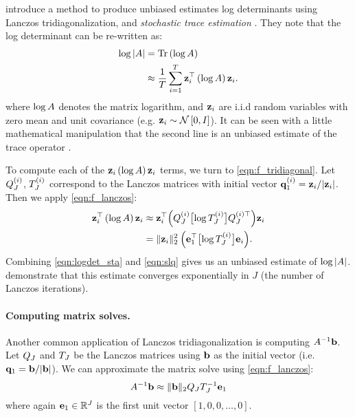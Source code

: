 \citet{ubaru2017fast} introduce a method to produce unbiased estimates log determinants using Lanczos tridiagonalization, and \emph{stochastic trace estimation} \cite{hutchinson1990stochastic,avron2011randomized,fitzsimons2016improved}.
They note that the log determinant can be re-written as:
%
\begin{align}
  \log \vert \bA \vert &= \tr{ \log \bA }
  \nonumber \\
  &\approx \frac{1}{T} \sum_{i=1}^T \bz_i^\top \left( \log \bA \right) \bz_i.
  \label{eqn:logdet_sta}
\end{align}
%
where $\log A$ denotes the matrix logarithm, and $\mathbf{z}_i$ are i.i.d random variables with zero mean and unit covariance (e.g. $\mathbf{z}_i \sim \mathcal{N} \left[ 0, I \right]$).
It can be seen with a little mathematical manipulation that the second line is an unbiased estimate of the trace operator \cite{hutchinson1990stochastic}.

To compute each of the $\mathbf{z}_i \left( \log A \right) \mathbf{z}_i$ terms, we turn to \cref{eqn:f_tridiagonal}.
Let $Q_J^{(i)}$, $T_J^{(i)}$ correspond to the Lanczos matrices with initial vector $\mathbf{q}^{(i)}_1 = \mathbf{z}_i / \vert \mathbf{z}_i \vert$.
Then we apply \cref{eqn:f_lanczos}:
%
\begin{align}
  \mathbf{z}_i^\top \left( \log A \right) \mathbf{z}_i
  &\approx \mathbf{z}_i^\top \Bigl( Q^{(i)}_J \bigl[ \log T^{(i)}_J \bigr] Q^{(i)\top}_J \Bigr) \mathbf{z}_i
  \nonumber
  \\
  &= \Vert \mathbf{z}_i \Vert^2_2 \: \Bigl( \mathbf{e}_1^\top \bigl[ \log T^{(i)}_J \bigr] \mathbf{e}_i \Bigr).
  \label{eqn:slq}
\end{align}
%
Combining \cref{eqn:logdet_sta} and \cref{eqn:slq} gives us an unbiased estimate of $\log \vert A \vert$.
\citet{ubaru2017fast} demonstrate that this estimate converges exponentially in $J$ (the number of Lanczos iterations).

\paragraph{Computing matrix solves.}
Another common application of Lanczos tridiagonalization is computing $A^{-1} \mathbf{b}$.
Let $Q_J$ and $T_J$ be the Lanczos matrices using $\mathbf{b}$ as the initial vector (i.e. $\mathbf{q}_1 = \mathbf{b} / \vert \mathbf{b} \vert$).
We can approximate the matrix solve using \cref{eqn:f_lanczos}:
%
\begin{equation}
  A^{-1} \mathbf{b} \approx \Vert \mathbf{b} \Vert_2 Q_J T_J^{-1} \mathbf{e}_1
  \label{eqn:lanczos_solves}
\end{equation}
%
where again $\mathbf{e}_1 \in \mathbb{R}^J$ is the first unit vector $[1, 0, 0, \ldots, 0]$.




